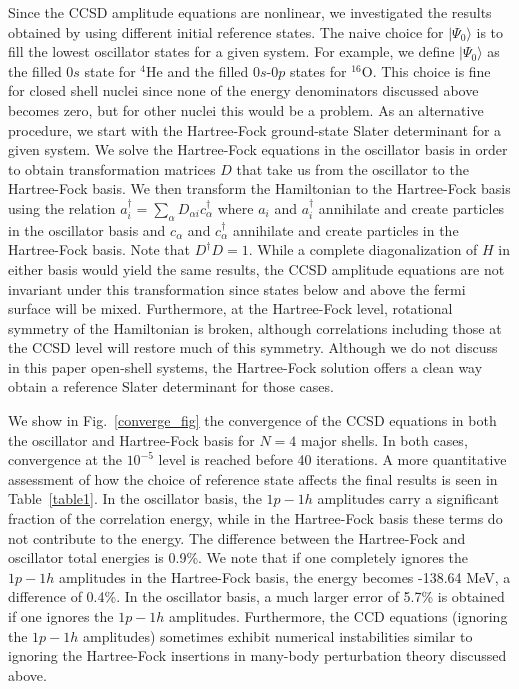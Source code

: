 \documentclass[aps,prc,twocolumn,floatfix]{revtex4}
\begin{document}
Since the CCSD amplitude equations are nonlinear, we investigated
the results obtained by using different initial reference
states. The naive choice for $\mid\Psi_0\rangle$ is to fill the 
lowest oscillator states for a given system. For example, we define 
$\mid\Psi_0\rangle$ as the filled $0s$ state for $^{4}$He and the
filled $0s$-$0p$ states for $^{16}$O. This choice is fine for closed
shell nuclei since none of the energy denominators discussed above becomes
zero, but for other nuclei this would be a problem. As an alternative 
procedure, we start with the Hartree-Fock ground-state Slater determinant
for a given system. We solve the Hartree-Fock equations in the oscillator
basis in order to obtain transformation matrices $D$ that take us from the
oscillator to the Hartree-Fock basis. We then transform the Hamiltonian 
to the Hartree-Fock basis using the relation 
$a_i^\dagger = \sum_{\alpha}D_{\alpha i}c_\alpha^\dagger$ where $a_i$ and
$a_i^\dagger$ annihilate and create particles in the oscillator basis and
$c_\alpha$ and $c_\alpha^\dagger$ annihilate and create particles in the 
Hartree-Fock basis. Note that $D^\dagger D =1$. While a complete 
diagonalization of $H$ in either basis would yield the same results, 
the CCSD amplitude equations are not invariant under this 
transformation since states below and above the fermi surface will be 
mixed. Furthermore, at the Hartree-Fock level, rotational symmetry of 
the Hamiltonian is broken, although correlations including those
at the CCSD level
will restore much of this symmetry. Although we do not discuss in this 
paper open-shell systems, the Hartree-Fock solution offers a clean way
obtain a reference Slater determinant for those cases. 

We show in Fig.~\ref{converge_fig} the convergence of the 
CCSD equations in both the oscillator and Hartree-Fock basis for 
$N=4$ major shells. In both cases, convergence at the $10^{-5}$ level
is reached before 40 iterations. A more quantitative assessment 
of how the choice of reference state affects the final results
is seen in Table~\ref{table1}. In the oscillator basis, the $1p-1h$ amplitudes
carry a significant fraction of the correlation energy, while in the 
Hartree-Fock basis these terms do not contribute to the energy.  The difference
between the Hartree-Fock and oscillator total energies is 0.9\%. 
We note that if one
completely ignores the $1p-1h$ amplitudes in the Hartree-Fock basis, the
energy becomes -138.64 MeV, a difference of 0.4\%. In the
oscillator basis, a much larger error of 5.7\% is obtained if one ignores
the $1p-1h$ amplitudes. Furthermore, the CCD equations (ignoring the 
$1p-1h$ amplitudes) sometimes exhibit numerical instabilities similar to
ignoring the Hartree-Fock insertions 
in many-body perturbation theory discussed above. 
\end{document}
